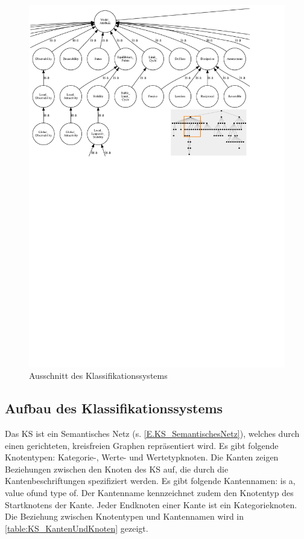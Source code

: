 \begin{figure}[bh]
	\centering
	\includegraphics[trim=0 680.7 95.5 0, clip, width=0.9\linewidth]{KS_Snippet}
	\caption{Ausschnitt des Klassifikationssystems}
	\label{fig:KS_Snippet}
\end{figure}

\subsection{Aufbau des Klassifikationssystems}
\label{Ch:Ergebniss:Sec:KS:SubSec:Aufbau}
Das KS ist ein Semantisches Netz (s. \autoref{E.KS_SemantischesNetz}), welches durch einen gerichteten, kreisfreien Graphen repräsentiert wird. Es gibt folgende Knotentypen: Kategorie-, Werte- und Wertetypknoten. 
Die Kanten zeigen Beziehungen zwischen den Knoten des KS auf, die durch die Kantenbeschriftungen spezifiziert werden. Es gibt folgende Kantennamen: \glqq is a\grqq, \glqq value of\grqq und \glqq type of\grqq. Der Kantenname kennzeichnet zudem den Knotentyp des Startknotens der Kante. Jeder Endknoten einer Kante ist ein Kategorieknoten. Die Beziehung zwischen Knotentypen und Kantennamen wird in \autoref{table:KS_KantenUndKnoten} gezeigt.

